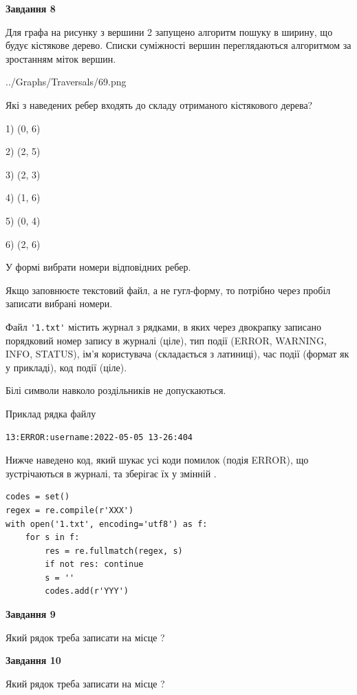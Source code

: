 \documentclass[12pt, ukrainian]{article}
\def\code#1{\Verb!#1!}
\begin{document}
{\begin {large}
{\begin {center}\textbf{Завдання 8}\end {center}}\par
Для графа на рисунку з вершини 2 запущено алгоритм пошуку в ширину, що будує кістякове дерево. Списки суміжності вершин переглядаються алгоритмом за зростанням міток вершин.\par
\begin{center}
	{../Graphs/Traversals/69.png}
\end{center}
\par Які з наведених ребер входять до складу отриманого кістякового дерева?\par
1) (0, 6)\par
2) (2, 5)\par
3) (2, 3)\par
4) (1, 6)\par
5) (0, 4)\par
6) (2, 6)\par
{\vskip 15pt} У формі вибрати номери відповідних ребер.


Якщо заповнюєте текстовий файл, а не гугл-форму, то потрібно через пробіл записа\-ти вибрані номери.\par
\newpage


Файл \code{'1.txt'} містить журнал з рядками, в яких через двокрапку записано поряд\-ко\-вий номер запису в журналі (ціле), тип події (ERROR, WARNING, INFO, STATUS), ім'я користувача (складається з латиниці), час події (фор\-мат як у прикладі), код події (ціле).

Білі символи навколо роздільників не допускаються.

Приклад рядка файлу



\begin{verbatim}
13:ERROR:username:2022-05-05 13-26:404
\end{verbatim}


Нижче наведено код, який шукає усі коди помилок (подія ERROR), що зустріча\-ють\-ся в журналі, та зберігає їх у змінній .



\begin{verbatim}
codes = set()
regex = re.compile(r'XXX')
with open('1.txt', encoding='utf8') as f:
    for s in f:
        res = re.fullmatch(regex, s)
        if not res: continue
        s = ''
        codes.add(r'YYY')
\end{verbatim}


{\begin {center}\textbf{Завдання 9}\end {center}}\par
Який рядок треба записати на місце  ?\par
\vspace{5mm}


{\begin {center}\textbf{Завдання 10}\end {center}}\par
Який рядок треба записати на місце  ?\par


\newpage


\end {large}}
\end{document}
